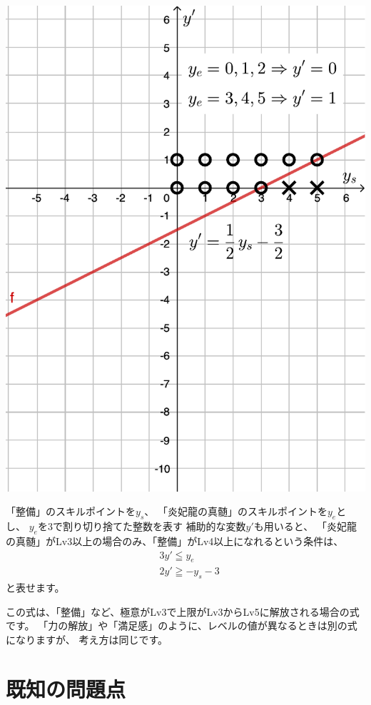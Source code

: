 \documentclass{jsarticle}
\begin{document}
\includegraphics[scale=0.5]{./fig/lpgraph5.pdf}
\hfil
\bigskip

「整備」のスキルポイントを$y_s$、
「炎妃龍の真髄」のスキルポイントを$y_e$とし、
$y_e$を3で割り切り捨てた整数を表す
補助的な変数$y'$も用いると、
「炎妃龍の真髄」がLv3以上の場合のみ、「整備」がLv4以上になれるという条件は、
%
\begin{align*}
& 3 y' \leqq y_e \\
& 2 y' \geqq  - y_s -3
\end{align*}
と表せます。

この式は、「整備」など、極意がLv3で上限がLv3からLv5に解放される場合の式です。
「力の解放」や「満足感」のように、レベルの値が異なるときは別の式になりますが、
考え方は同じです。

\section{既知の問題点} \label{sec:known-bugs}
\end{document}
